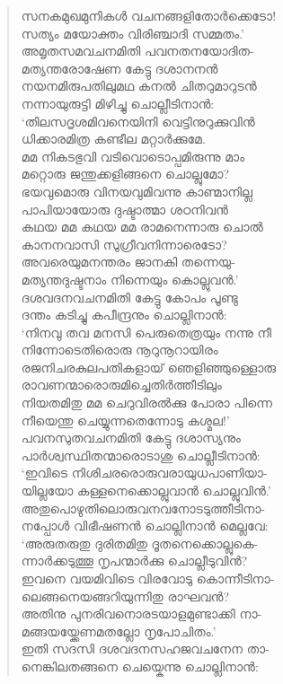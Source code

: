 \begin{verse}
സനകമുഖമുനികള്‍ വചനങ്ങളിതോര്‍ക്കെടോ!\\
സത്യം മയോക്തം വിരിഞ്ചാദി സമ്മതം.’\\
അമൃതസമവചനമിതി പവനതനയോദിത-\\
മത്യന്തരോഷേണ കേട്ടു ദശാനനന്‍\\
നയനമിരുപതിലുമഥ കനല്‍ ചിതറുമാറുടന്‍\\
നന്നായുരുട്ടി മിഴിച്ചു ചൊല്ലീടിനാന്‍:\\
‘തിലസദൃശമിവനെയിനി വെട്ടിനുറുക്കുവിന്‍\\
ധിക്കാരമിത്ര കണ്ടീല മറ്റാര്‍ക്കുമേ.\\
മമ നികടഭുവി വടിവൊടൊപ്പമിരുന്നു മാം\\
മറ്റൊരു ജന്തുക്കളിങ്ങനെ ചൊല്ലുമോ?\\
ഭയവുമൊരു വിനയവുമിവന്നു കാണ്മാനില്ല\\
പാപിയായോരു ദുഷ്ടാത്മാ ശഠനിവന്‍\\
കഥയ മമ കഥയ മമ രാമനെന്നാരു ചൊല്‍\\
കാനനവാസി സുഗ്രീവനിന്നാരെടോ?\\
അവരെയുമനന്തരം ജാനകി തന്നെയു-\\
മത്യന്തദുഷ്ടനാം നിന്നെയും കൊല്ലുവന്‍.’\\
ദശവദനവചനമിതി കേട്ടു കോപം പൂണ്ടു\\
ദന്തം കടിച്ചു കപീന്ദ്രനും ചൊല്ലിനാന്‍:\\
‘നിനവു തവ മനസി പെരുതെത്രയും നന്നു നീ\\
നിന്നോടെതിരൊരു നൂറുനൂറായിരം\\
രജനിചരകുലപതികളായ് ഞെളിഞ്ഞുള്ളൊരു\\
രാവണന്മാരൊരുമിച്ചെതിര്‍ത്തീടിലും\\
നിയതമിതു മമ ചെറുവിരല്‍ക്കു പോരാ പിന്നെ\\
നീയെന്തു ചെയ്യുന്നതെന്നോടു കശ്മല!’\\
പവനസുതവചനമിതി കേട്ടു ദശാസ്യനും\\
പാര്‍ശ്വസ്ഥിതന്മാരൊടാശു ചൊല്ലീടിനാന്‍:\\
‘ഇവിടെ നിശിചരരൊരുവരായുധപാണിയാ-\\
യില്ലയോ കള്ളനെക്കൊല്ലുവാന്‍ ചൊല്ലുവിന്‍.’\\
അതുപൊഴുതിലൊരുവനവനോടടുത്തീടിനാ-\\
നപ്പോള്‍ വിഭീഷണന്‍ ചൊല്ലിനാന്‍ മെല്ലവേ:\\
‘അരുതരുതു ദുരിതമിതു ദൂതനെക്കൊല്ലുകെ-\\
ന്നാര്‍ക്കടുത്തൂ നൃപന്മാര്‍ക്കു ചൊല്ലീടുവിന്‍?\\
ഇവനെ വയമിവിടെ വിരവോടു കൊന്നീടിനാ-\\
ലെങ്ങനെയങ്ങറിയുന്നിതു രാഘവന്‍?\\
അതിനു പുനരിവനൊരടയാളമുണ്ടാക്കി നാ-\\
മങ്ങയയ്ക്കേണമതല്ലോ നൃപോചിതം.’\\
ഇതി സദസി ദശവദനസഹജവചനേന താ-\\
നെങ്കിലതങ്ങനെ ചെയ്കെന്നു ചൊല്ലിനാന്‍:
\end{verse}

